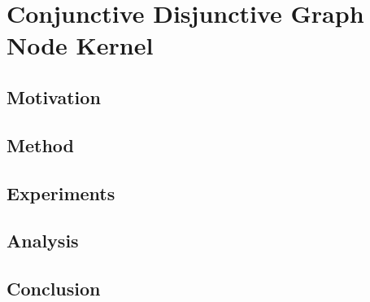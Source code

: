 \chapter{Conjunctive Disjunctive Graph Node Kernel}
\section{Motivation}
\section{Method}
\section{Experiments}
\section{Analysis}
\section{Conclusion}